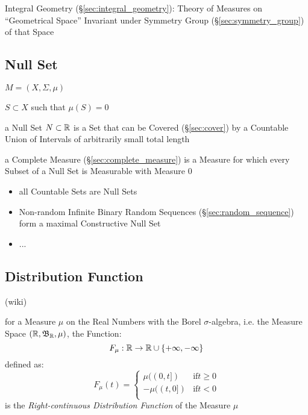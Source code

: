 \fist Integral Geometry (\S\ref{sec:integral_geometry}): Theory of Measures on
``Geometrical Space'' Invariant under Symmetry Group
(\S\ref{sec:symmetry_group}) of that Space



\subsection{Null Set}\label{sec:null_set}

$M = (X, \Sigma, \mu)$

$S \subset X$ such that $\mu(S) = 0$

a Null Set $N \subset \mathbb{R}$ is a Set that can be Covered (\S\ref{sec:cover})
by a Countable Union of Intervals of arbitrarily small total length

a Complete Measure (\S\ref{sec:complete_measure}) is a Measure for which every
Subset of a Null Set is Measurable with Measure $0$

\begin{itemize}
  \item all Countable Sets are Null Sets
  \item Non-random Infinite Binary Random Sequences
    (\S\ref{sec:random_sequence}) form a maximal Constructive Null Set
  \item ...
\end{itemize}



\subsection{Distribution Function}\label{sec:distribution_function}

(wiki)

for a Measure $\mu$ on the Real Numbers with the Borel $\sigma$-algebra, i.e.
the Measure Space $(\mathbb{R}, \mathfrak{B}_{\mathbb{R}}, \mu)$, the Function:
\[
  F_\mu : \mathbb{R} \rightarrow \mathbb{R} \cup \{+\infty, -\infty\}
\]
defined as:
\[
  F_\mu(t) = \begin{cases}
     \mu((0,t]) & \text{if} t \geq 0 \\
    -\mu((t,0]) & \text{if} t < 0 \\
  \end{cases}
\]
is the \emph{Right-continuous Distribution Function} of the Measure $\mu$

